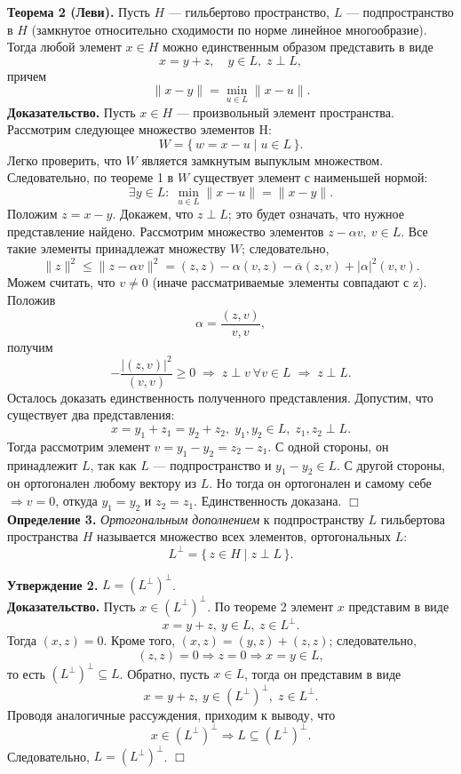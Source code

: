 \documentclass[12pt,a4paper, titlepage]{article}
\begin{document}
\textbf{Теорема 2 (Леви).} Пусть $H$ --- гильбертово пространство, $L$ --- подпространство в $H$ (замкнутое относительно сходимости по норме линейное многообразие). Тогда любой элемент $x \in H$ можно единственным образом представить в виде
$$
x = y + z, \quad y \in L, \; z \perp L,
$$
причем
$$
\|x - y\| = \min_{u \in L} \|x - u\|.
$$
\textbf{Доказательство. } Пусть $x \in H$ --- произвольный элемент пространства. Рассмотрим следующее множество элементов H:
$$
W = \{\, w = x - u \mid u \in L\,\}.
$$
Легко проверить, что $W$ является замкнутым выпуклым множеством. Следовательно, по теореме 1 в $W$ существует элемент с наименьшей нормой:
$$
\exists y \in L: \; \min_{u \in L} \|x - u\| = \|x - y\|.
$$
Положим $z = x - y$. Докажем, что $z \perp L$; это будет означать, что нужное представление найдено.
Рассмотрим множество элементов $z - \alpha v, \ v \in L$. Все такие элементы принадлежат множеству $W$; следовательно,
$$
\|z\|^2 \leqslant \|z - \alpha v\|^2 = (z, z) - \alpha (v, z) - \overline{\alpha} (z, v) + |\alpha |^2 (v, v).
$$
Можем считать, что $v \neq 0$ (иначе рассматриваемые элементы совпадают с z). Положив 
$$
\alpha = \frac{(z, v)}{v, v},
$$
получим
$$
- \frac{|(z, v)|^2}{(v, v)} \geqslant 0 \; \Rightarrow \; z \perp v \ \forall v \in L \; \Rightarrow \; z \perp L.
$$
Осталось доказать единственность полученного представления. Допустим, что существует два представления:
$$
x = y_1 + z_1 = y_2 + z_2, \; y_1, y_2 \in L, \; z_1, z_2 \perp L.
$$
Тогда рассмотрим элемент $v = y_1 - y_2 = z_2 - z_1$. С одной стороны, он принадлежит $L$, так как $L$ --- подпространство и $y_1 - y_2 \in L$. С другой стороны, он ортогонален любому вектору из $L$. Но тогда он ортогонален и самому себе $\Rightarrow v = 0$, откуда $y_1 = y_2$ и $z_2 = z_1$. Единственность доказана. $\Box$\\

\textbf{Определение 3.} \textit{Ортогональным дополнением} к подпространству $L$ гильбертова пространства $H$ называется множество всех элементов, ортогональных $L$:
$$
L^\perp = \{\,z \in H \mid z \perp L\,\}.
$$ 

\textbf{Утверждение 2.} $L = \left(L^\perp\right)^\perp$.\\
\textbf{Доказательство.} Пусть $x \in \left(L^\perp\right)^\perp$. По теореме 2 элемент $x$ представим в виде
$$
x = y + z,\ y \in L,\ z \in L^\perp.
$$
Тогда $(x, z) = 0$. Кроме того, $(x, z) = (y, z) + (z, z)$; следовательно, 
$$
(z, z) = 0 \Rightarrow z = 0 \Rightarrow x = y \in L,
$$
то есть $\left(L^\perp\right)^\perp \subseteq L$.
Обратно, пусть $x \in L$, тогда он представим в виде
$$
x = y + z,\ y \in \left(L^\perp\right)^\perp,\; z \in L^\perp.
$$
Проводя аналогичные рассуждения, приходим к выводу, что 
$$
x \in \left(L^\perp\right)^\perp \Rightarrow L \subseteq \left(L^\perp\right)^\perp.
$$
Следовательно, $L = \left(L^\perp\right)^\perp$. $\Box$\\
\end{document}
